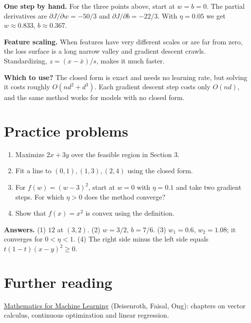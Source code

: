 \documentclass[11pt,a4paper]{article}
\begin{document}
\textbf{One step by hand.} For the three points above, start at $w = b = 0$. The partial derivatives are $\partial J/\partial w = -50/3$ and $\partial J/\partial b = -22/3$. With $\eta = 0.05$ we get $w \approx 0.833$, $b \approx 0.367$.

\textbf{Feature scaling.} When features have very different scales or are far from zero, the loss surface is a long narrow valley and gradient descent crawls. Standardizing, $z = (x - \bar{x})/s$, makes it much faster.

\textbf{Which to use?} The closed form is exact and needs no learning rate, but solving it costs roughly $O(nd^2 + d^3)$. Each gradient descent step costs only $O(nd)$, and the same method works for models with no closed form.

\section{Practice problems}
\begin{enumerate}
\item Maximize $2x + 3y$ over the feasible region in Section 3.
\item Fit a line to $(0,1), (1,3), (2,4)$ using the closed form.
\item For $f(w) = (w-3)^2$, start at $w = 0$ with $\eta = 0.1$ and take two gradient steps. For which $\eta > 0$ does the method converge?
\item Show that $f(x) = x^2$ is convex using the definition.
\end{enumerate}
\textbf{Answers.} (1) $12$ at $(3,2)$. (2) $w = 3/2$, $b = 7/6$. (3) $w_1 = 0.6$, $w_2 = 1.08$; it converges for $0 < \eta < 1$. (4) The right side minus the left side equals $t(1-t)(x-y)^2 \ge 0$.

\section{Further reading}
\href{https://mml-book.github.io/}{Mathematics for Machine Learning} (Deisenroth, Faisal, Ong): chapters on vector calculus, continuous optimization and linear regression.
\end{document}
